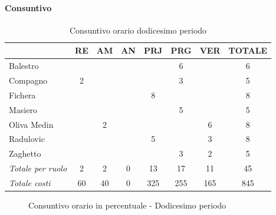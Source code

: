 \documentclass[a4paper,12pt]{article}
\begin{document}
            \paragraph{Consuntivo}
                \begin{table}[H]
                \centering
                \caption{Consuntivo orario dodicesimo periodo}
                \begin{tabular}{|l|c|c|c|c|c|c|c|}
                \hline
                    \rowcolor{lightgray}{\textbf{Membro}} & {\textbf{RE}} & {\textbf{AM}} & {\textbf{AN}} & {\textbf{PRJ}} & {\textbf{PRG}} & {\textbf{VER}} & {\textbf{TOTALE}}\\
                \hline
                    Balestro & & & & & 6 & & 6\\
                \hline
                    Compagno & 2 & & & & 3 & & 5\\
                \hline
                    Fichera & & & & 8 & & & 8\\
                \hline
                    Masiero & & & & & 5 & & 5\\
                \hline
                    Oliva Medin & & 2 & & & & 6 & 8\\
                \hline
                    Radulovic & & & & 5 & & 3 & 8\\
                \hline
                    Zaghetto & & & & & 3 & 2 & 5\\
                \hline
                    \rowcolor{lightgray}\textit{Totale per ruolo} & 2 & 2 & 0 & 13 & 17 & 11 & 45\\
                \hline
                    \rowcolor{lightgray}\textit{Totale costi} & 60 & 40 & 0 & 325 & 255 & 165 & 845\\
                \hline
                \end{tabular}
                \end{table}

                \begin{figure}[H]
                \centering
                \caption{Consuntivo orario in percentuale - Dodicesimo periodo}
                \end{figure}
                
\end{document}
